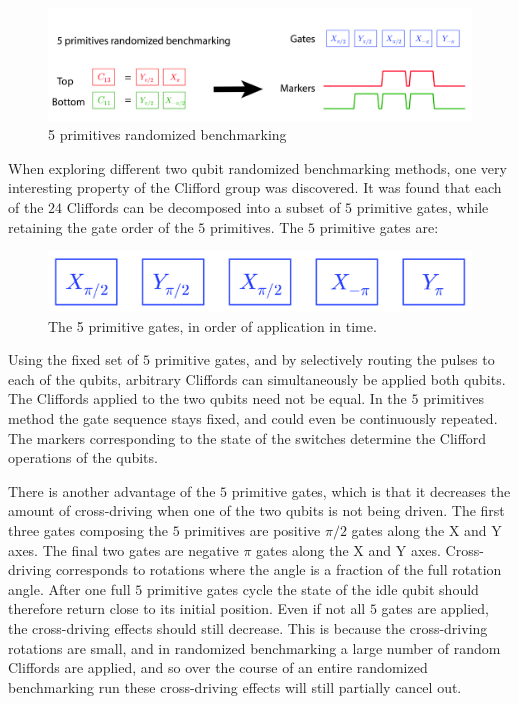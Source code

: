         \begin{figure}[tb]
          \centering
          \includegraphics[width=\textwidth]{../Figures/Randomized benchmarking/5 primitives RB.jpg}
          \caption{5 primitives randomized benchmarking}
          \label{fig:5 primitives RB schematic}
        \end{figure}

        When exploring different two qubit randomized benchmarking methods, one very interesting property of the Clifford group was discovered. It was found that each of the $24$ Cliffords can be decomposed into a subset of $5$ primitive gates, while retaining the gate order of the $5$ primitives. The $5$ primitive gates are:

        \begin{figure}[h!]
          \centering
          \includegraphics[width=.5\textwidth]{../Figures/Randomized benchmarking/5 primitive gates.jpg}
          \caption{The 5 primitive gates, in order of application in time.}
          \label{5 primitive gates}
        \end{figure}

        Using the fixed set of $5$ primitive gates, and by selectively routing the pulses to each of the qubits, arbitrary Cliffords can simultaneously be applied both qubits. The Cliffords applied to the two qubits need not be equal. In the $5$ primitives method the gate sequence stays fixed, and could even be continuously repeated. The markers corresponding to the state of the switches determine the Clifford operations of the qubits.

        There is another advantage of the $5$ primitive gates, which is that it decreases the amount of cross-driving when one of the two qubits is not being driven. The first three gates composing the $5$ primitives are positive $\pi/2$ gates along the X and Y axes. The final two gates are negative $\pi$ gates along the X and Y axes. Cross-driving corresponds to rotations where the angle is a fraction of the full rotation angle. After one full $5$ primitive gates cycle the state of the idle qubit should therefore return close to its initial position. Even if not all $5$ gates are applied, the cross-driving effects should still decrease. This is because the cross-driving rotations are small, and in randomized benchmarking a large number of random Cliffords are applied, and so over the course of an entire randomized benchmarking run these cross-driving effects will still partially cancel out.

